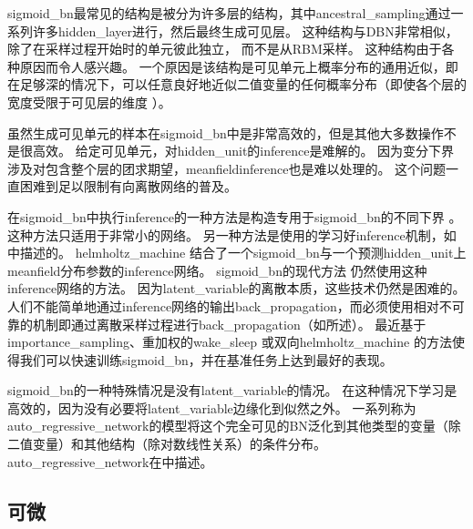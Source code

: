 \gls{sigmoid_bn}最常见的结构是被分为许多层的结构，其中\gls{ancestral_sampling}通过一系列许多\gls{hidden_layer}进行，然后最终生成可见层。
这种结构与\gls{DBN}非常相似，除了在采样过程开始时的单元彼此独立， 而不是从\gls{RBM}采样。
这种结构由于各种原因而令人感兴趣。
一个原因是该结构是可见单元上概率分布的通用近似，即在足够深的情况下，可以任意良好地近似二值变量的任何概率分布（即使各个层的宽度受限于可见层的维度 ）\citep{Sutskever+Hinton-2008}。


虽然生成可见单元的样本在\gls{sigmoid_bn}中是非常高效的，但是其他大多数操作不是很高效。
给定可见单元，对\gls{hidden_unit}的\gls{inference}是难解的。
因为变分下界涉及对包含整个层的团求期望，\gls{meanfield}\gls{inference}也是难以处理的。
这个问题一直困难到足以限制有向离散网络的普及。


在\gls{sigmoid_bn}中执行\gls{inference}的一种方法是构造专用于\gls{sigmoid_bn}的不同下界 \citep{Saul+96}。
这种方法只适用于非常小的网络。
另一种方法是使用的学习好\gls{inference}机制，如中描述的。
\gls{helmholtz_machine} \citep{Dayan-et-al-1995,dayan1996varieties} 结合了一个\gls{sigmoid_bn}与一个预测\gls{hidden_unit}上\gls{meanfield}分布参数的\gls{inference}网络。
\gls{sigmoid_bn}的现代方法\citep{Gregor-et-al-ICML2014,Mnih+Gregor-ICML2014} 仍然使用这种\gls{inference}网络的方法。
因为\gls{latent_variable}的离散本质，这些技术仍然是困难的。
人们不能简单地通过\gls{inference}网络的输出\gls{back_propagation}，而必须使用相对不可靠的机制即通过离散采样过程进行\gls{back_propagation}（如所述）。
最近基于\gls{importance_sampling}、重加权的\gls{wake_sleep}\citep{Bornschein+Bengio-ICLR2015-small} 或双向\gls{helmholtz_machine}\citep{Bornschein-et-al-arxiv2015-small} 的方法使得我们可以快速训练\gls{sigmoid_bn}，并在基准任务上达到最好的表现。

\gls{sigmoid_bn}的一种特殊情况是没有\gls{latent_variable}的情况。
在这种情况下学习是高效的，因为没有必要将\gls{latent_variable}边缘化到似然之外。
一系列称为\gls{auto_regressive_network}的模型将这个完全可见的\gls{BN}泛化到其他类型的变量（除二值变量）和其他结构（除对数线性关系）的条件分布。
\gls{auto_regressive_network}在中描述。


\subsection{可微}
\label{sec:differentiable_generator_networks}

